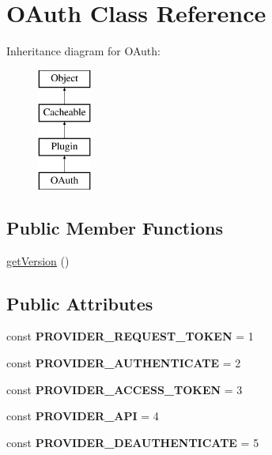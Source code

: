 \hypertarget{class_o_auth}{\section{O\-Auth Class Reference}
\label{class_o_auth}
}
Inheritance diagram for O\-Auth\-:\begin{figure}[H]
\begin{center}
\leavevmode
\includegraphics[height=4.000000cm]{class_o_auth}
\end{center}
\end{figure}
\subsection*{Public Member Functions}
\begin{DoxyCompactItemize}
\item 
\hyperlink{class_o_auth_a33ca56b17ef9f806d4e90f12ffb5a519}{get\-Version} ()
\end{DoxyCompactItemize}
\subsection*{Public Attributes}
\begin{DoxyCompactItemize}
\item 
\hypertarget{class_o_auth_abaa7773efb9f021ef2717964c76c11c8}{const {\bfseries P\-R\-O\-V\-I\-D\-E\-R\-\_\-\-R\-E\-Q\-U\-E\-S\-T\-\_\-\-T\-O\-K\-E\-N} = 1}\label{class_o_auth_abaa7773efb9f021ef2717964c76c11c8}

\item 
\hypertarget{class_o_auth_ab17012d0b52f35f695b038332091522f}{const {\bfseries P\-R\-O\-V\-I\-D\-E\-R\-\_\-\-A\-U\-T\-H\-E\-N\-T\-I\-C\-A\-T\-E} = 2}\label{class_o_auth_ab17012d0b52f35f695b038332091522f}

\item 
\hypertarget{class_o_auth_aada53f9c18e23916e0479ae28fe30f49}{const {\bfseries P\-R\-O\-V\-I\-D\-E\-R\-\_\-\-A\-C\-C\-E\-S\-S\-\_\-\-T\-O\-K\-E\-N} = 3}\label{class_o_auth_aada53f9c18e23916e0479ae28fe30f49}

\item 
\hypertarget{class_o_auth_a86e61fbe7038fdbe5c4a3f86c55d67b7}{const {\bfseries P\-R\-O\-V\-I\-D\-E\-R\-\_\-\-A\-P\-I} = 4}\label{class_o_auth_a86e61fbe7038fdbe5c4a3f86c55d67b7}

\item 
\hypertarget{class_o_auth_a572c596809b8bf175f5445eacc4a2531}{const {\bfseries P\-R\-O\-V\-I\-D\-E\-R\-\_\-\-D\-E\-A\-U\-T\-H\-E\-N\-T\-I\-C\-A\-T\-E} = 5}\label{class_o_auth_a572c596809b8bf175f5445eacc4a2531}

\end{DoxyCompactItemize}
